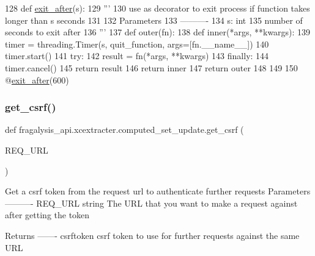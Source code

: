 \begin{DoxyCode}
128 \textcolor{keyword}{def }\hyperlink{namespacefragalysis__api_1_1xcextracter_1_1computed__set__update_ab6ecfd5eeae5a05ee20fa0d19c798f48}{exit\_after}(s):
129     \textcolor{stringliteral}{'''}
130 \textcolor{stringliteral}{    use as decorator to exit process if function takes longer than s seconds}
131 \textcolor{stringliteral}{    }
132 \textcolor{stringliteral}{    Parameters}
133 \textcolor{stringliteral}{    ----------}
134 \textcolor{stringliteral}{    s: int}
135 \textcolor{stringliteral}{        number of seconds to exit after}
136 \textcolor{stringliteral}{    '''}
137     \textcolor{keyword}{def }outer(fn):
138         \textcolor{keyword}{def }inner(*args, **kwargs):
139             timer = threading.Timer(s, quit\_function, args=[fn.\_\_name\_\_])
140             timer.start()
141             \textcolor{keywordflow}{try}:
142                 result = fn(*args, **kwargs)
143             \textcolor{keywordflow}{finally}:
144                 timer.cancel()
145             \textcolor{keywordflow}{return} result
146         \textcolor{keywordflow}{return} inner
147     \textcolor{keywordflow}{return} outer
148 
149 
150 @\hyperlink{namespacefragalysis__api_1_1xcextracter_1_1computed__set__update_ab6ecfd5eeae5a05ee20fa0d19c798f48}{exit\_after}(600)
\end{DoxyCode}
\mbox{\label{namespacefragalysis__api_1_1xcextracter_1_1computed__set__update_a5737d189121121fcfc89d399bf38e877}} 
\subsubsection{\texorpdfstring{get\+\_\+csrf()}{get\_csrf()}}
{\footnotesize\ttfamily def fragalysis\+\_\+api.\+xcextracter.\+computed\+\_\+set\+\_\+update.\+get\+\_\+csrf (\begin{DoxyParamCaption}\item[{}]{R\+E\+Q\+\_\+\+U\+RL }\end{DoxyParamCaption})}

\begin{DoxyVerb}Get a csrf token from the request url to authenticate further requests
Parameters
----------
REQ_URL string
    The URL that you want to make a request against after getting the token

Returns
-------
csrftoken
    csrf token to use for further requests against the same URL
\end{DoxyVerb}
 


